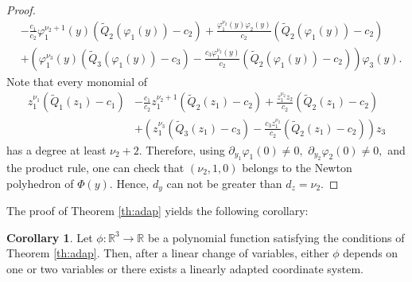 \documentclass[a4paper, 11pt]{article}
\theoremstyle{plain}
\theoremstyle{definition}
\theoremstyle{lemma}
\theoremstyle{Remark}
\theoremstyle{proposition}
\theoremstyle{corollary}
\newtheorem{corollary}[theorem]{Corollary}
\theoremstyle{example}
\theoremstyle{assumption}
\begin{document}
\begin{proof}
\begin{align*}
&-\frac{c_1}{c_2}\varphi_1^{\nu_2+1}(y)(\tilde Q_2(\varphi_1(y))-c_2) +\frac{\varphi_1^{\nu_2}(y)\varphi_2(y)}{c_2}(\tilde Q_2(\varphi_1(y))-c_2)\\
&+\left(\varphi_1^{\nu_3}(y)(\tilde Q_3(\varphi_1(y))-c_3)-\frac{c_3\varphi_1^{\nu_2}(y) }{c_2}(\tilde Q_2(\varphi_1(y))-c_2)\right)\varphi_3(y).
\end{align*}
Note that  every monomial of %
\begin{align*}
z_1^{\nu_1}(\tilde Q_1(z_1)-c_1)&-\frac{c_1}{c_2}z_1^{\nu_2+1}(\tilde Q_2(z_1)-c_2) +\frac{z_1^{\nu_2}z_2}{c_2}(\tilde Q_2(z_1)-c_2)\\ &  +\left(z_1^{\nu_3}(\tilde Q_3(z_1)-c_3)-\frac{c_3z_1^{\nu_2} }{c_2}(\tilde Q_2(z_1)-c_2)\right)z_3
\end{align*}
 has a degree at least  $\nu_2+2.$ Therefore,
using $\partial_{y_1}\varphi_1(0)\neq 0,$ $\partial_{y_2}\varphi_2(0)\neq 0,$ and the product rule, one can check that $(\nu_2,1,0)$ belongs to the Newton polyhedron of $\Phi(y).$ Hence,  $d_y$ can not be greater than $d_z=\nu_2.$


\end{proof}

The proof of Theorem \ref{th:adap} yields the following corollary:
\begin{corollary}\label{cor:obvious}
Let  $\phi:\mathbb{R}^3\to \mathbb{R}$ be a  polynomial function  satisfying the conditions of Theorem   \ref{th:adap}. Then, after a linear change of variables,  either  $\phi$ depends on one or two variables  or there exists a linearly adapted coordinate system.
\end{corollary}
\end{document}
